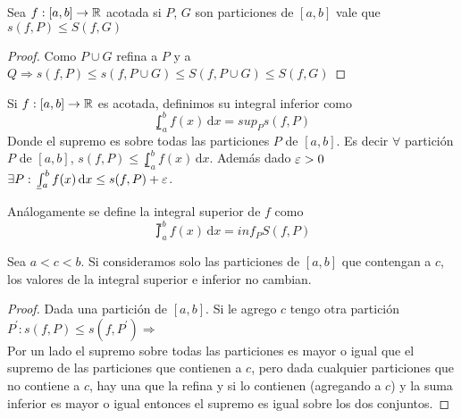 \begin{corollary}
  Sea $f: [a, b] \to \mathbb{R}$ acotada si $P$, $G$ son particiones de $[a, b]$ vale que $s(f, P) \leq S(f, G)$
  \begin{proof}
    Como $P \cup G$ refina a $P$ y a $Q \Rightarrow s(f, P) \leq s(f, P \cup G) \leq S(f, P \cup G) \leq S(f, G)$
  \end{proof}
\end{corollary}

\begin{definition}
  Si $f: [a, b] \to \mathbb{R}$ es acotada, definimos su integral inferior como \begin{equation}
    \lowint_a^b f(x)\,\mathrm{d}x = sup_P s(f, P)
  \end{equation}
  Donde el supremo es sobre todas las particiones $P$ de $[a, b]$. Es decir $\forall$ partición $P$ de $[a, b]$, $s(f, P) \leq \lowint_a^b f(x)\, \mathrm{d}x$.
  Además dado $\varepsilon > 0$ $\exists P : \lowint_a^b f(x)\, \mathrm{d}x \leq s(f, P) + \e$.
\end{definition}

\begin{definition}
  Análogamente se define la integral superior de $f$ como \begin{equation}
    \upint_a^b f(x)\, \mathrm{d}x = inf_P S(f, P)
  \end{equation}
\end{definition}

\begin{lemma}
  Sea $a < c < b$. Si consideramos solo las particiones de $[a, b]$ que contengan a $c$, los valores de la integral superior e inferior no cambian.
  \begin{proof}
    Dada una partición de $[a, b]$. Si le agrego $c$ tengo otra partición $P^{\prime} : s(f, P) \leq s(f, P^{\prime}) \Rightarrow$ \\
    Por un lado el supremo sobre todas las particiones es mayor o igual que el supremo de las particiones que contienen a $c$, pero dada cualquier particiones que no contiene a $c$,
    hay una que la refina y si lo contienen (agregando a $c$) y la suma inferior es mayor o igual entonces el supremo es igual sobre los dos conjuntos.
  \end{proof}
\end{lemma}

